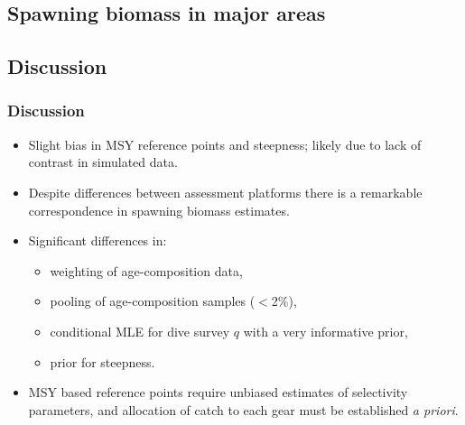 \subsection{Spawning biomass in major areas} %
\label{sub:spawning_biomass_in_major_areas}
\begin{frame}[c]
\end{frame}

\subsection{Discussion} %
\label{sub:discussion}
\begin{frame}[t]\frametitle{Discussion}
	\begin{itemize}
		\item<+-> Slight bias in MSY reference points and steepness; likely due to lack of contrast in simulated data.
		\item<+-> Despite differences between assessment platforms there is a remarkable correspondence in spawning biomass estimates.
		
		\item<+-> Significant differences in:
		\begin{itemize}
			\item weighting of age-composition data,
			\item pooling of age-composition samples ($<$2\%),
			\item conditional MLE for dive survey $q$ with a very informative prior,
			\item prior for steepness.
		\end{itemize}
		\item<+-> MSY based reference points require unbiased estimates of selectivity parameters, and allocation of catch to each gear must be established \textit{a priori}.
	\end{itemize}
\end{frame}






















